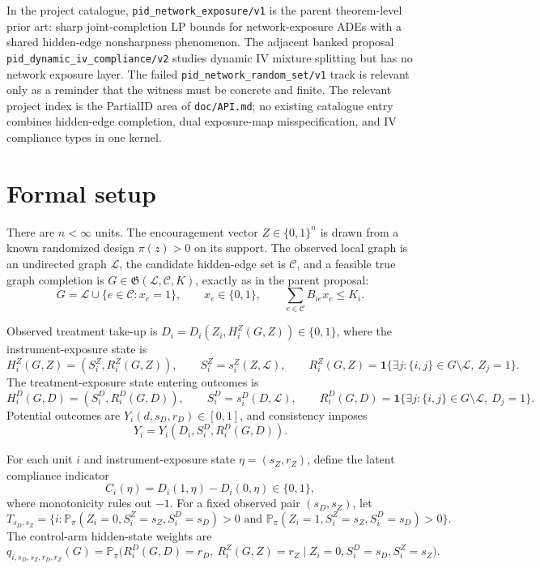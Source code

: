 \documentclass[11pt]{article}
\renewcommand{\Pr}{\mathbb{P}}
\newcommand{\one}{\mathbf{1}}
\theoremstyle{definition}
\theoremstyle{plain}
\theoremstyle{remark}
\begin{document}
In the project catalogue, \texttt{pid\_network\_exposure/v1} is the parent theorem-level prior art: sharp joint-completion LP bounds for network-exposure ADEs with a shared hidden-edge nonsharpness phenomenon. The adjacent banked proposal \texttt{pid\_dynamic\_iv\_compliance/v2} studies dynamic IV mixture splitting but has no network exposure layer. The failed \texttt{pid\_network\_random\_set/v1} track is relevant only as a reminder that the witness must be concrete and finite. The relevant project index is the PartialID area of \texttt{doc/API.md}; no existing catalogue entry combines hidden-edge completion, dual exposure-map misspecification, and IV compliance types in one kernel.

\section{Formal setup}
There are \(n<\infty\) units. The encouragement vector \(Z\in\{0,1\}^n\) is drawn from a known randomized design \(\pi(z)>0\) on its support. The observed local graph is an undirected graph \(\mathcal L\), the candidate hidden-edge set is \(\mathcal C\), and a feasible true graph completion is \(G\in\mathfrak G(\mathcal L,\mathcal C,K)\), exactly as in the parent proposal:
\[
G=\mathcal L\cup\{e\in\mathcal C:x_e=1\},\qquad x_e\in\{0,1\},\qquad
\sum_{e\in\mathcal C}B_{ie}x_e\le K_i.
\]

Observed treatment take-up is \(D_i=D_i(Z_i,H_i^Z(G,Z))\in\{0,1\}\), where the instrument-exposure state is
\[
H_i^Z(G,Z)=(S_i^Z,R_i^Z(G,Z)),
\qquad
S_i^Z=s_i^Z(Z,\mathcal L),
\qquad
R_i^Z(G,Z)=\one\{\exists j:\{i,j\}\in G\setminus\mathcal L,\ Z_j=1\}.
\]
The treatment-exposure state entering outcomes is
\[
H_i^D(G,D)=(S_i^D,R_i^D(G,D)),
\qquad
S_i^D=s_i^D(D,\mathcal L),
\qquad
R_i^D(G,D)=\one\{\exists j:\{i,j\}\in G\setminus\mathcal L,\ D_j=1\}.
\]
Potential outcomes are \(Y_i(d,s_D,r_D)\in[0,1]\), and consistency imposes
\[
Y_i=Y_i(D_i,S_i^D,R_i^D(G,D)).
\]

For each unit \(i\) and instrument-exposure state \(\eta=(s_Z,r_Z)\), define the latent compliance indicator
\[
C_i(\eta)=D_i(1,\eta)-D_i(0,\eta)\in\{0,1\},
\]
where monotonicity rules out \(-1\). For a fixed observed pair \((s_D,s_Z)\), let
\[
T_{s_D,s_Z}
=
\{i:\Pr_\pi(Z_i=0,S_i^Z=s_Z,S_i^D=s_D)>0 \text{ and } \Pr_\pi(Z_i=1,S_i^Z=s_Z,S_i^D=s_D)>0\}.
\]
The control-arm hidden-state weights are
\[
q_{i,s_D,s_Z,r_D,r_Z}(G)
=
\Pr_\pi\!\big(R_i^D(G,D)=r_D,\ R_i^Z(G,Z)=r_Z \mid Z_i=0,S_i^D=s_D,S_i^Z=s_Z\big).
\]
\end{document}
